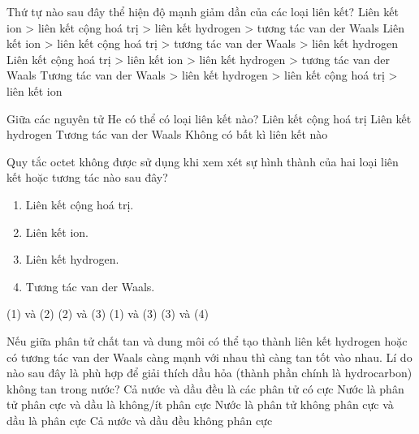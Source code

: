 \begin{ex}
	Thứ tự nào sau đây thể hiện độ mạnh giảm dần của các loại liên kết?
	\choice
	{\True Liên kết ion > liên kết cộng hoá trị > liên kết hydrogen > tương tác van der Waals}
	{Liên kết ion > liên kết cộng hoá trị > tương tác van der Waals > liên kết hydrogen}
	{Liên kết cộng hoá trị > liên kết ion > liên kết hydrogen > tương tác van der Waals}
	{Tương tác van der Waals > liên kết hydrogen > liên kết cộng hoá trị > liên kết ion}
	\loigiai{}
\end{ex}

\begin{ex}
	Giữa các nguyên tử He có thể có loại liên kết nào?
	\choice
	{Liên kết cộng hoá trị}
	{Liên kết hydrogen}
	{\True Tương tác van der Waals}
	{Không có bất kì liên kết nào}
\end{ex}

\begin{ex}
	Quy tắc octet không được sử dụng khi xem xét sự hình thành của hai loại liên kết hoặc tương tác nào sau đây?
	\begin{enumerate}[(1)]
		\item  Liên kết cộng hoá trị.
		\item  Liên kết ion.
		\item  Liên kết hydrogen.
		\item  Tương tác van der Waals.
	\end{enumerate}
	\choice
	{(1) và (2)}
	{(2) và (3)}
	{(1) và (3)}
	{\True (3) và (4)}
	\loigiai{}
\end{ex}

\begin{ex}
	Nếu giữa phân tử chất tan và dung môi có thể tạo thành liên kết hydrogen
	hoặc có tương tác van der Waals càng mạnh với nhau thì càng tan tốt vào nhau.
	Lí do nào sau đây là phù hợp để giải thích dầu hỏa (thành phần chính là
	hydrocarbon) không tan trong nước?
	\choice
	{Cả nước và dầu đều là các phân tử có cực}
	{\True Nước là phân tử phân cực và dầu là không/ít phân cực}
	{Nước là phân tử không phân cực và dầu là phân cực}
	{Cả nước và dầu đều không phân cực}
	\loigiai{}
\end{ex}


